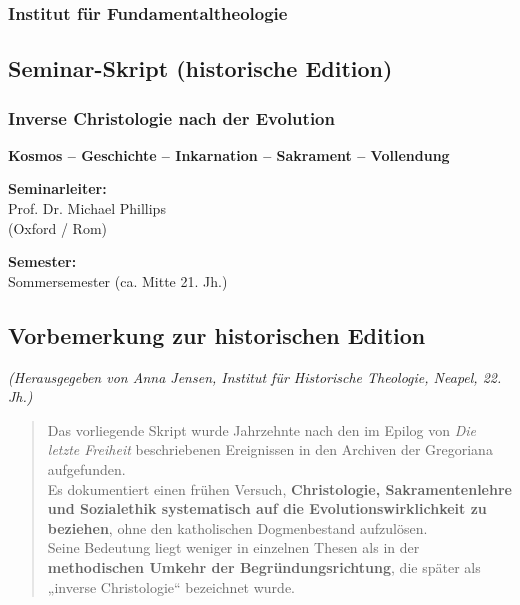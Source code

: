 \documentclass[
]{article}
\begin{document}
\subsubsection{\texorpdfstring{\textbf{Institut für Fundamentaltheologie}}{Institut für Fundamentaltheologie}}\label{institut-fuxfcr-fundamentaltheologie}

\subsection{\texorpdfstring{\textbf{Seminar-Skript (historische Edition)}}{Seminar-Skript (historische Edition)}}\label{seminar-skript-historische-edition}

\subsubsection{\texorpdfstring{\textbf{Inverse Christologie nach der Evolution}}{Inverse Christologie nach der Evolution}}\label{inverse-christologie-nach-der-evolution}

\textbf{Kosmos -- Geschichte -- Inkarnation -- Sakrament -- Vollendung}

\textbf{Seminarleiter:\\
}Prof. Dr. Michael Phillips\\
(Oxford / Rom)

\textbf{Semester:\\
}Sommersemester (ca. Mitte 21. Jh.)

\subsection{\texorpdfstring{\textbf{Vorbemerkung zur historischen Edition}}{Vorbemerkung zur historischen Edition}}\label{vorbemerkung-zur-historischen-edition}

\emph{(Herausgegeben von Anna Jensen, Institut für Historische Theologie, Neapel, 22. Jh.)}

\begin{quote}
Das vorliegende Skript wurde Jahrzehnte nach den im Epilog von \emph{Die letzte Freiheit} beschriebenen Ereignissen in den Archiven der Gregoriana aufgefunden.\\
Es dokumentiert einen frühen Versuch, \textbf{Christologie, Sakramentenlehre und Sozialethik systematisch auf die Evolutionswirklichkeit zu beziehen}, ohne den katholischen Dogmenbestand aufzulösen.\\
Seine Bedeutung liegt weniger in einzelnen Thesen als in der \textbf{methodischen Umkehr der Begründungsrichtung}, die später als „inverse Christologie`` bezeichnet wurde.
\end{quote}
\end{document}
